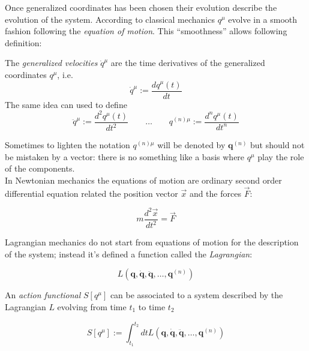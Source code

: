 Once generalized coordinates has been chosen their evolution describe the
evolution of the system. According to classical mechanics $q^{\mu}$ evolve
in a smooth fashion following the \emph{equation of motion}. This
``smoothness'' allows following definition:

\begin{definition}
  The \emph{generalized velocities} $\dot{q}^{\mu}$ are the time derivatives of
  the generalized coordinates $q^{\mu}$, i.e.
  \begin{equation*}
    \dot{q}^{\mu} := \frac{dq^{\mu}(t)}{dt}
  \end{equation*}
  The same idea can used to define
  \begin{equation*}
    \ddot{q}^{\mu} := \frac{d^2 q^{\mu}(t)}{dt^2} \qquad \ldots \qquad
        q^{(n)\mu} := \frac{d^n q^{\mu}(t)}{dt^n}
  \end{equation*}
\end{definition}

Sometimes to lighten the notation $q^{(n)\mu}$ will be denoted by
$\bm{q}^{(n)}$ but should not be mistaken by a vector: there is no something
like a basis where $q^{\mu}$ play the role of the components. \\

In Newtonian mechanics the equations of motion are ordinary second order
differential equation related the position vector $\vec{x}$ and the forces
$\vec{F}$:

\begin{equation*}
  m \frac{d^2\vec{x}}{dt^2} = \vec{F}
\end{equation*}

Lagrangian mechanics do not start from equations of motion for the description
of the system; instead it's defined a function called the \emph{Lagrangian}:

\begin{equation} \label{eq:general_lagrangian}
  L(\bm{q}, \dot{\bm{q}}, \ddot{\bm{q}}, \ldots, \bm{q}^{(n)})
\end{equation}

An \emph{action functional} $S[q^{\mu}]$ can be associated to a system described
by the Lagrangian $L$ evolving from time $t_1$ to time $t_2$

\begin{equation} \label{eq:general_action}
  S[q^{\mu}] := \int_{t_1}^{t_2} dt
  L(\bm{q}, \dot{\bm{q}}, \ddot{\bm{q}}, \ldots, \bm{q}^{(n)})
\end{equation}

